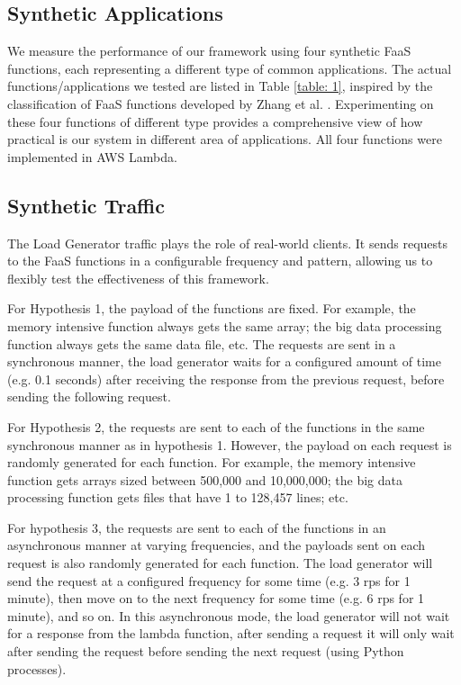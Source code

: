 \documentclass[conference]{IEEEtran}
\begin{document}
\subsection{Synthetic Applications}

We measure the performance of our framework using four synthetic FaaS functions, each representing a different type of common applications. The actual functions/applications we tested are listed in Table \ref{table: 1}, inspired by the classification of FaaS functions developed by Zhang et al. \cite{10.1007/978-3-030-96326-2_2}. Experimenting on these four functions of different type provides a comprehensive view of how practical is our system in different area of applications. All four functions were implemented in AWS Lambda.

\subsection{Synthetic Traffic}

The Load Generator traffic plays the role of real-world clients. It sends requests to the FaaS functions in a configurable frequency and pattern, allowing us to flexibly test the effectiveness of this framework.

For Hypothesis 1, the payload of the functions are fixed. For example, the memory intensive function always gets the same array; the big data processing function always gets the same data file, etc. The requests are sent in a synchronous manner, the load generator waits for a configured amount of time (e.g. 0.1 seconds) after receiving the response from the previous request, before sending the following request.

For Hypothesis 2, the requests are sent to each of the functions in the same synchronous manner as in hypothesis 1. However, the payload on each request is randomly generated for each function. For example, the memory intensive function gets arrays sized between 500,000 and 10,000,000; the big data processing function gets files that have 1 to 128,457 lines; etc. 

For hypothesis 3, the requests are sent to each of the functions in an asynchronous manner at varying frequencies, and the payloads sent on each request is also randomly generated for each function. The load generator will send the request at a configured frequency for some time (e.g. 3 rps for 1 minute), then move on to the next frequency for some time (e.g. 6 rps for 1 minute), and so on. In this asynchronous mode, the load generator will not wait for a response from the lambda function, after sending a request it will only wait after sending the request before sending the next request (using Python processes).
\end{document}
